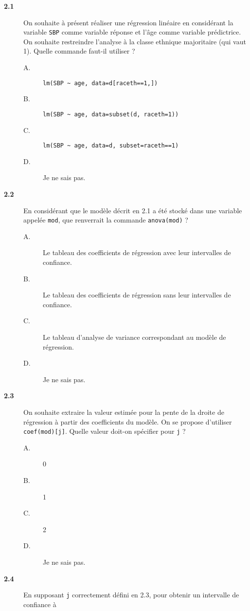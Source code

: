 \documentclass[11pt]{report}
\theoremstyle{definition}
\begin{document}
\begin{description}
\item[\bf 2.1]  On souhaite à présent réaliser une
  régression linéaire en considérant la variable \texttt{SBP} comme variable
  réponse et l'âge comme variable prédictrice. On souhaite restreindre
  l'analyse à la classe ethnique majoritaire (qui vaut 1). Quelle commande
  faut-il utiliser ?
    \begin{description}
    \item[A.] \verb|lm(SBP ~ age, data=d[raceth==1,])|
    \item[B.] \verb|lm(SBP ~ age, data=subset(d, raceth=1))|
    \item[C.] \verb|lm(SBP ~ age, data=d, subset=raceth==1)|
    \item[D.] Je ne sais pas.
    \end{description}  
  \item[\bf 2.2]  En considérant que le modèle
    décrit en 2.1 a été stocké dans une variable appelée \texttt{mod}, que
    renverrait la commande \verb|anova(mod)| ?
    \begin{description}
    \item[A.] Le tableau des coefficients de régression avec leur
      intervalles de confiance.
    \item[B.] Le tableau des coefficients de régression sans leur
      intervalles de confiance.
    \item[C.] Le tableau d'analyse de variance correspondant au modèle de
      régression.
    \item[D.] Je ne sais pas.
    \end{description}  
  \item[\bf 2.3]  On souhaite extraire la valeur
    estimée pour la pente de la droite de régression à partir des
    coefficients du modèle. On se propose d'utiliser
    \verb|coef(mod)[j]|. Quelle valeur doit-on spécifier pour \texttt{j} ?
  \begin{description}
  \item[A.] 0
  \item[B.] 1
  \item[C.] 2
  \item[D.] Je ne sais pas.
  \end{description}
\item[\bf 2.4]  En supposant \texttt{j}
  correctement défini en 2.3, pour obtenir un intervalle de confiance à

\end{description}
\end{document}
